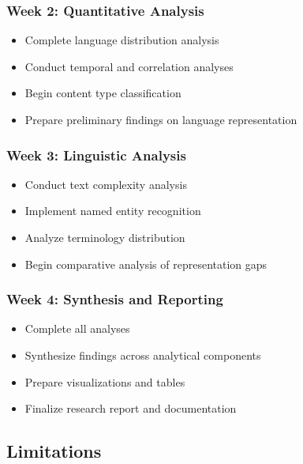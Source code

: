 \documentclass[
]{article}
\providecommand{\tightlist}{%
  \setlength{\itemsep}{0pt}\setlength{\parskip}{0pt}}\usepackage{longtable,booktabs,array}
\begin{document}
\subsubsection{Week 2: Quantitative
Analysis}\label{week-2-quantitative-analysis}

\begin{itemize}
\tightlist
\item
  Complete language distribution analysis
\item
  Conduct temporal and correlation analyses
\item
  Begin content type classification
\item
  Prepare preliminary findings on language representation
\end{itemize}

\subsubsection{Week 3: Linguistic
Analysis}\label{week-3-linguistic-analysis}

\begin{itemize}
\tightlist
\item
  Conduct text complexity analysis
\item
  Implement named entity recognition
\item
  Analyze terminology distribution
\item
  Begin comparative analysis of representation gaps
\end{itemize}

\subsubsection{Week 4: Synthesis and
Reporting}\label{week-4-synthesis-and-reporting}

\begin{itemize}
\tightlist
\item
  Complete all analyses
\item
  Synthesize findings across analytical components
\item
  Prepare visualizations and tables
\item
  Finalize research report and documentation
\end{itemize}

\subsection{Limitations}\label{limitations}
\end{document}
